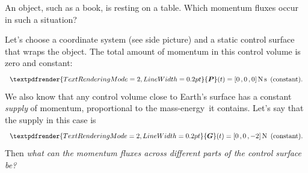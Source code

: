 \documentclass[a4paper,12pt,%
onecolumn,oneside,%
british%
]{memoir}
\renewcommand*{\bm}[1]{\textpdfrender{TextRenderingMode=2,LineWidth=0.2pt}{\boldsymbol{#1}}}
\renewcommand*{\|}[1][]{\nonscript\:#1\vert\nonscript\:\mathopen{}}
\newcommand*{\sect}{\S}%
\renewcommand*{\autoref}[2]{\sidepar{\vspace{-1ex}\footnotesize{\color{blue}\faIcon{%
angle-right%
}\enskip\sect~\ref{#1} page~\pageref{#1}}}\textcolor{blue}{#2}}
\newcommand*{\masse}{mass-energy}
\newcommand*{\yP}{\bm{P}}
\newcommand*{\yG}{\bm{G}}
\begin{document}
An object, such as a book, is resting on a table. Which momentum fluxes occur in such a situation?
%
%

Let's choose a coordinate system (see side picture) and a static control surface that wraps the object. The total amount of momentum in this control volume is zero and constant:
\begin{equation*}
  \yP(t) = [0\,,0\,,0]\,\unit{N\,s}\enskip\text{(constant)}.
\end{equation*}
We also know that any control volume close to Earth's surface %
has a constant \emph{supply} of momentum, proportional to the \masse\ it contains. Let's say that the supply in this case is
\begin{equation*}
  \yG(t) = [0\,,0\,,\num{-2}]\,\unit{N}\enskip\text{(constant)}.
\end{equation*}
Then \emph{what can the momentum fluxes across different parts of the control surface be?}
\end{document}
